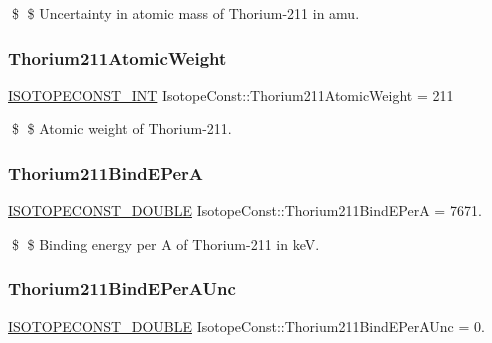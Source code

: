 \$ \$ Uncertainty in atomic mass of Thorium-\/211 in amu. \mbox{\label{group___isotope_const-_thorium-_th211_ga47e62e238955244bdeec42ff20acdc3f}} 
\subsubsection{\texorpdfstring{Thorium211\+Atomic\+Weight}{Thorium211AtomicWeight}}
{\footnotesize\ttfamily \mbox{\hyperlink{group___isotope_const-_macros_ga5f18360b3e99483a35c32d789e62621c}{I\+S\+O\+T\+O\+P\+E\+C\+O\+N\+S\+T\+\_\+\+I\+NT}} Isotope\+Const\+::\+Thorium211\+Atomic\+Weight = 211}

\$ \$ Atomic weight of Thorium-\/211. \mbox{\label{group___isotope_const-_thorium-_th211_ga944ffba4a670da8b84cb92af8c61f4e1}} 
\subsubsection{\texorpdfstring{Thorium211\+Bind\+E\+PerA}{Thorium211BindEPerA}}
{\footnotesize\ttfamily \mbox{\hyperlink{group___isotope_const-_macros_ga8f45a7272ce02c0b4c65c44636ed719a}{I\+S\+O\+T\+O\+P\+E\+C\+O\+N\+S\+T\+\_\+\+D\+O\+U\+B\+LE}} Isotope\+Const\+::\+Thorium211\+Bind\+E\+PerA = 7671.}

\$ \$ Binding energy per A of Thorium-\/211 in keV. \mbox{\label{group___isotope_const-_thorium-_th211_ga80703050ad8fe2258233c6ed1b732cd2}} 
\subsubsection{\texorpdfstring{Thorium211\+Bind\+E\+Per\+A\+Unc}{Thorium211BindEPerAUnc}}
{\footnotesize\ttfamily \mbox{\hyperlink{group___isotope_const-_macros_ga8f45a7272ce02c0b4c65c44636ed719a}{I\+S\+O\+T\+O\+P\+E\+C\+O\+N\+S\+T\+\_\+\+D\+O\+U\+B\+LE}} Isotope\+Const\+::\+Thorium211\+Bind\+E\+Per\+A\+Unc = 0.}

